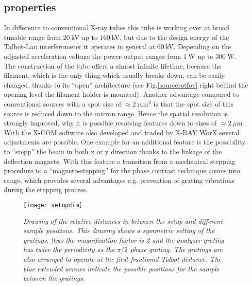 \subsection{properties}\label{subsec:sprop}
In difference to conventional X-ray tubes this tube is working over at broad tunable range from $20\ $kV up to $160\ $kV, but due to the design energy of the Talbot-Lau interferometer it operates in general at $60\ $kV. Depending on the adjusted acceleration voltage the power-output ranges from $1\ $W up to $300\ $W. The construction of the tube offers a almost infinite lifetime, because the filament, which is the only thing which usually breaks down, can be easily changed, thanks to its \enquote{open} architecture (see Fig.\ref{sourcerotfoc} right behind the opening level the filament holder is mounted). Another advantage compared to conventional sources with a spot size of $\approx 2\ \text{mm}^{2}$ is that the spot size of this source is reduced down to the micron range. Hence the spatial resolution is strongly improved, why it is possible resolving features down to sizes of $\approx 2\ \mu$m \citep{Datashort}. With the X-COM software \citep{X-COMsoft} also developed and traded by X-RAY WorX several adjustments are possible. One example for an additional feature is the possibility to \enquote{stepp} the beam in both x or y direction thanks to the linkage of the deflection magnets. With this feature a transition from a mechanical stepping procedure to a \enquote{magneto-stepping} for the phase contrast technique comes into range, which provides several advantages e.g. prevention of grating vibrations during the stepping process.
\begin{figure}[h]
	\begin{center}
		\texttt{[image: setupdim]}
	\end{center}
	\caption[Drawing of the relative distances between the particular parts of the setup]{\textit{Drawing of the relative distances in-between the setup and different sample positions. This drawing shows a symmetric setting of the gratings, thus the magnification factor is 2 and the analyser grating has twice the periodicity as the $\pi/2 $ phase grating. The gratings are also arranged to operate at the first fractional Talbot distance. The blue extended arrows indicate the possible positions for the sample between the gratings.}}
	\label{setupdim}
\end{figure} 
